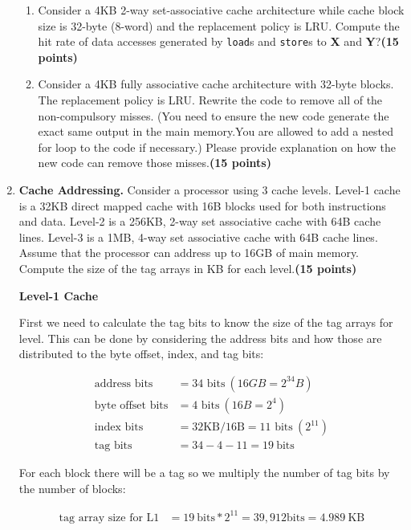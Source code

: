 \documentclass[a4paper, 11pt]{exam}
\begin{document}
\begin{enumerate}
\begin{enumerate}
\item Consider a 4KB 2-way set-associative cache architecture while cache block size is 32-byte (8-word) and the replacement policy is LRU. Compute the hit rate of data accesses generated by \texttt{load}s and \texttt{store}s to \textbf{X} and \textbf{Y}?\textbf{(15 points)}




\item Consider a 4KB fully associative cache architecture with 32-byte blocks. The replacement policy is LRU. Rewrite the code to remove  all of the non-compulsory misses. (You need to ensure the new code generate the exact same output in the main memory.You are allowed to add a nested for loop to the code if necessary.) Please provide explanation on how the new code can remove those misses.\textbf{(15 points)}


\end{enumerate}



\item \textbf {Cache Addressing.} Consider a processor using 3 cache levels. Level-1 cache is a
32KB direct mapped cache with 16B blocks used for both instructions and data. Level-2 is a
256KB, 2-way set associative cache with 64B cache lines. Level-3 is a
1MB, 4-way set associative cache with 64B cache lines. Assume that the processor can
address up to 16GB of main memory.  Compute the size of the tag arrays in KB for each level.\textbf{(15 points)}


\textbf{Level-1 Cache}

First we need to calculate the tag bits to know the size of the tag arrays for level. This can be done by considering the address bits and how those are distributed to the byte offset, index, and tag bits:

\begin{align*}
\text{address bits} &= \text{34 bits} \  (16GB = 2^{34} B) \\
\text{byte offset bits} &= \text{4 bits} \ (16B = 2^4) \\
\text{index bits} &= \text{32KB/16B} = \text{11 bits} \ (2^{11})\\
\text{tag bits} &= 34 - 4 - 11 = 19 \ \text{bits}         
\end{align*}

For each block there will be a tag so we multiply the number of tag bits by the number of blocks:

\begin{align*}
\text{tag array size for L1} &= 19 \ \text{bits} * 2^{11} = 39, 912 \text{bits} = 4.989 \ \text{KB} 	
\end{align*}


\end{enumerate}
\end{document}
